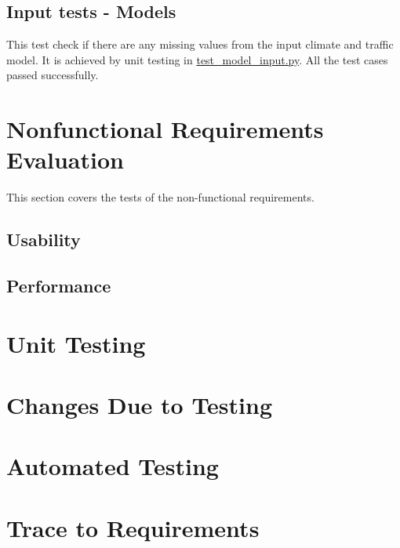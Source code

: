 \documentclass[12pt, titlepage]{article}
\begin{document}
\subsection{Input tests - Models}
This test check if there are any missing values from the input climate and traffic model. It is achieved by unit testing in  \href{https://github.com/CynthiaLiu0805/BridgeCorrosion/blob/main/src/database/test_model_check.py}{test\_model\_input.py}. All the test cases passed successfully. 

\section{Nonfunctional Requirements Evaluation}
This section covers the tests of the non-functional requirements.

\subsection{Usability}
		
\subsection{Performance}



\section{Unit Testing}

\section{Changes Due to Testing}


\section{Automated Testing}
		
\section{Trace to Requirements}
		
\end{document}

